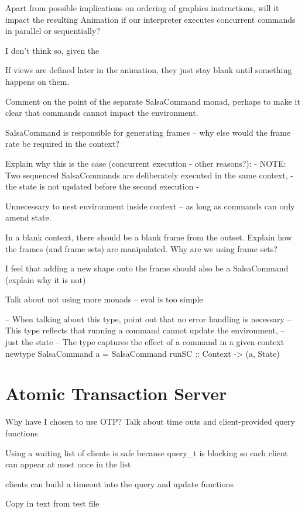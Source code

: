 \documentclass[
paper=a4,
oneside,
fontsize=11pt,
numbers=noenddot,
headinclude=false, %
footinclude=false, %
fleqn,             %
DIV=8
]{scrartcl}
\begin{document}
Apart from possible implications on ordering of graphics instructions, will it
impact the resulting Animation if our interpreter executes concurrent commands
in parallel or sequentially?

I don't think so, given the 

If views are defined later in the animation, they just stay blank until
something happens on them.

Comment on the point of the separate SalsaCommand monad, perhaps to make it
clear that commands cannot impact the environment.

SalsaCommand is responsible for generating frames -- why else would the frame
rate be required in the context?

Explain why this is the case (concurrent execution - other reasons?):
{- NOTE: Two sequenced SalsaCommands are deliberately executed in the same context,
 - the state is not updated before the second execution -}

Unnecessary to nest environment inside context -- as long as commands can only
amend state.

In a blank context, there should be a blank frame from the outset. Explain how
the frames (and frame sets) are manipulated.  Why are we using frame sets?

I feel that adding a new shape onto the frame should also be a SalsaCommand
(explain why it is not)

Talk about not using more monads -- eval is too simple

-- When talking about this type, point out that no error handling is necessary
-- This type reflects that running a command cannot update the environment,
-- just the state
-- The type captures the effect of a command in a given context
newtype SalsaCommand a = SalsaCommand { runSC :: Context -> (a, State) }

\section{Atomic Transaction Server}

Why have I chosen to use OTP?
Talk about time outs and client-provided query functions

Using a waiting list of clients is safe because query_t is blocking so each
client can appear at most once in the list

clients can build a timeout into the query and update functions

Copy in text from test file
\end{document}
